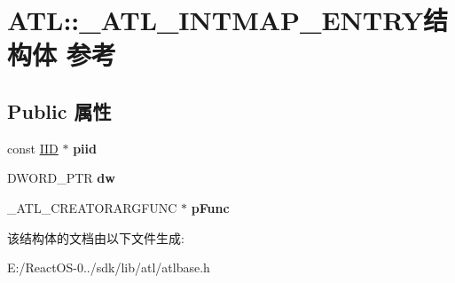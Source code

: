 \hypertarget{struct_a_t_l_1_1___a_t_l___i_n_t_m_a_p___e_n_t_r_y}{}\section{A\+TL\+:\+:\+\_\+\+A\+T\+L\+\_\+\+I\+N\+T\+M\+A\+P\+\_\+\+E\+N\+T\+R\+Y结构体 参考}
\label{struct_a_t_l_1_1___a_t_l___i_n_t_m_a_p___e_n_t_r_y}
\subsection*{Public 属性}
\begin{DoxyCompactItemize}
\item 
\mbox{\label{struct_a_t_l_1_1___a_t_l___i_n_t_m_a_p___e_n_t_r_y_a163cc77cbaa0be9391338c6a2ae3b56d}} 
const \hyperlink{struct___i_i_d}{I\+ID} $\ast$ {\bfseries piid}
\item 
\mbox{\label{struct_a_t_l_1_1___a_t_l___i_n_t_m_a_p___e_n_t_r_y_a1a228f2cc8af152621a6db1bf4034b0c}} 
D\+W\+O\+R\+D\+\_\+\+P\+TR {\bfseries dw}
\item 
\mbox{\label{struct_a_t_l_1_1___a_t_l___i_n_t_m_a_p___e_n_t_r_y_ad860b1b837e8eab870c12d21f6f5c447}} 
\+\_\+\+A\+T\+L\+\_\+\+C\+R\+E\+A\+T\+O\+R\+A\+R\+G\+F\+U\+NC $\ast$ {\bfseries p\+Func}
\end{DoxyCompactItemize}


该结构体的文档由以下文件生成\+:\begin{DoxyCompactItemize}
\item 
E\+:/\+React\+O\+S-\/0../sdk/lib/atl/atlbase.\+h\end{DoxyCompactItemize}
